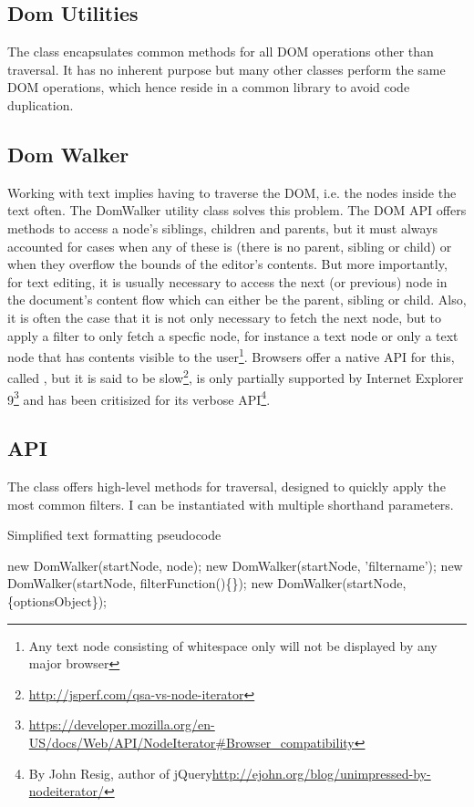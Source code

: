 \subsection{Dom Utilities}

The  class encapsulates common methods for all DOM operations other than traversal. It has no inherent purpose but many other classes perform the same DOM operations, which hence reside in a common library to avoid code duplication.

\subsection{Dom Walker}

Working with text implies having to traverse the DOM, i.e. the nodes inside the text often. The {DomWalker} utility class solves this problem. The DOM API offers methods to access a node's siblings, children and parents, but it must always accounted for cases when any of these is  (there is no parent, sibling or child) or when they overflow the bounds of the editor's contents. But more importantly, for text editing, it is usually necessary to access the next (or previous) node in the document's content flow which can either be the parent, sibling or child. Also, it is often the case that it is not only necessary to fetch the next node, but to apply a filter to only fetch a specfic node, for instance a text node or only a text node that has contents visible to the user\footnote{Any text node consisting of whitespace only will not be displayed by any major browser}. Browsers offer a native API for this, called , but it is said to be slow\footnote{\url{http://jsperf.com/qsa-vs-node-iterator}}, is only partially supported by Internet Explorer 9\footnote{\url{https://developer.mozilla.org/en-US/docs/Web/API/NodeIterator\#Browser_compatibility}} and has been critisized for its verbose API\footnote{By John Resig, author of jQuery\url{http://ejohn.org/blog/unimpressed-by-nodeiterator/}}.

\subsection{API}

The  class offers high-level methods for traversal, designed to quickly apply the most common filters. I can be instantiated with multiple shorthand parameters.

\begin{algorithm}
\caption{Simplified text formatting pseudocode}
\label{alg:format_pseudocode}
\begin{algorithmic}[1]
\State new DomWalker(startNode, node);
\State new DomWalker(startNode, 'filtername');
\State new DomWalker(startNode, filterFunction()\{\});
\State new DomWalker(startNode,\{optionsObject\});
\end{algorithmic}
\end{algorithm}

